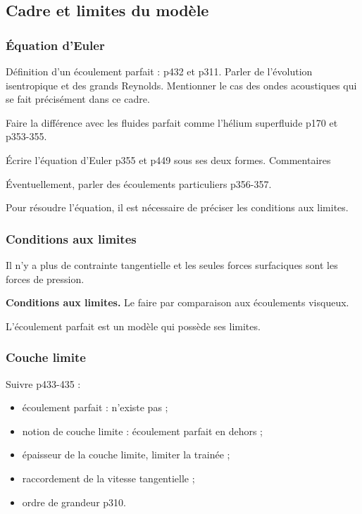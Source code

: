 \subsection{Cadre et limites du modèle}

\subsubsection{Équation d'Euler}


Définition d'un écoulement parfait : \cite{Olivier2000} p432 et \cite{Sanz2016} p311.
Parler de l'évolution isentropique et des grands Reynolds.
Mentionner le cas des ondes acoustiques qui se fait précisément dans ce cadre.

Faire la différence avec les fluides parfait comme l'hélium superfluide \cite{Guyon2001} p170 et p353-355.

Écrire l'équation d'Euler \cite{Sanz2016} p355 et \cite{Olivier2000} p449 sous ses deux formes.
Commentaires

Éventuellement, parler des écoulements particuliers \cite{Sanz2016} p356-357.

\begin{transition}
Pour résoudre l'équation, il est nécessaire de préciser les conditions aux limites.
\end{transition}

\subsubsection{Conditions aux limites}

Il n'y a plus de contrainte tangentielle et les seules forces surfaciques sont les forces de pression.

\begin{slide}
\textbf{Conditions aux limites.}
Le faire par comparaison aux écoulements visqueux.
\end{slide}

\begin{transition}
L'écoulement parfait est un modèle qui possède ses limites.
\end{transition}

\subsubsection{Couche limite}

Suivre \cite{Olivier2000} p433-435 :
\begin{itemize}
\item écoulement parfait : n'existe pas ;
\item notion de couche limite : écoulement parfait en dehors ;
\item épaisseur de la couche limite, limiter la trainée ;
\item raccordement de la vitesse tangentielle ;
\item ordre de grandeur \cite{Sanz2016} p310.
\end{itemize}


